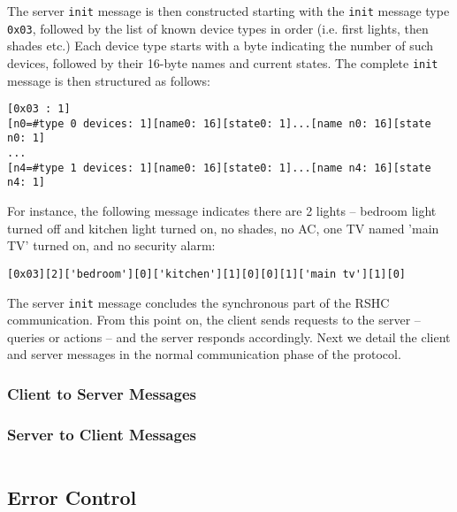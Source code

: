 \noindent
The server {\tt init} message is then constructed starting with the {\tt init} message type {\tt 0x03}, followed by the list of known device types in order (i.e. first lights, then shades etc.) Each device type starts with a byte indicating the number of such devices, followed by their 16-byte names and current states. The complete {\tt init} message is then structured as follows:

\begin{verbatim}
[0x03 : 1]
[n0=#type 0 devices: 1][name0: 16][state0: 1]...[name n0: 16][state n0: 1]
...
[n4=#type 1 devices: 1][name0: 16][state0: 1]...[name n4: 16][state n4: 1]
\end{verbatim}

\noindent
For instance, the following message indicates there are 2 lights -- bedroom light turned off and kitchen light turned on, no shades, no AC, one TV named 'main TV' turned on, and no security alarm:

\begin{verbatim}
[0x03][2]['bedroom'][0]['kitchen'][1][0][0][1]['main tv'][1][0]
\end{verbatim}

\noindent
The server {\tt init} message concludes the synchronous part of the RSHC communication. From this point on, the client sends requests to the server -- queries or actions -- and the server responds accordingly. Next we detail the client and server messages in the normal communication phase of the protocol.


\subsubsection{Client to Server Messages}
\label{sec:pdus:pdu:c_to_s}



\subsubsection{Server to Client Messages}
\label{sec:pdus:pdu:s_to_c}



\begin{verbatim}

\end{verbatim}


\subsection{Error Control}
\label{sec:pdus:err}




